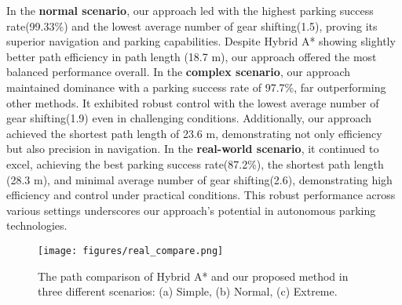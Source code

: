 \documentclass[ conference]{./support/ieeeconf}
\begin{document}

In the \textbf{normal scenario}, our approach led with the highest parking success rate(99.33\%) and the lowest average number of gear shifting(1.5), proving its superior navigation and parking capabilities. Despite Hybrid A* showing slightly better path efficiency in path length (18.7 m), our approach offered the most balanced performance overall.
In the \textbf{complex scenario}, our approach maintained dominance with a parking success rate of 97.7\%, far outperforming other methods. It exhibited robust control with the lowest average number of gear shifting(1.9) even in challenging conditions. Additionally, our approach achieved the shortest path length of 23.6 m, demonstrating not only efficiency but also precision in navigation.
In the \textbf{real-world scenario}, it continued to excel, achieving the best parking success rate(87.2\%), the shortest path length (28.3 m), and minimal average number of gear shifting(2.6), demonstrating high efficiency and control under practical conditions. This robust performance across various settings underscores our approach's potential in autonomous parking technologies.

\begin{figure}[t]
	\centering
        \texttt{[image: figures/real\_compare.png]}
	\caption{The path comparison of Hybrid A* and our proposed method in three different scenarios: (a) Simple, (b) Normal, (c) Extreme.}
	\label{compare_fig_sim2}
        \vspace{-0.3cm}
\end {figure}
\end{document}
